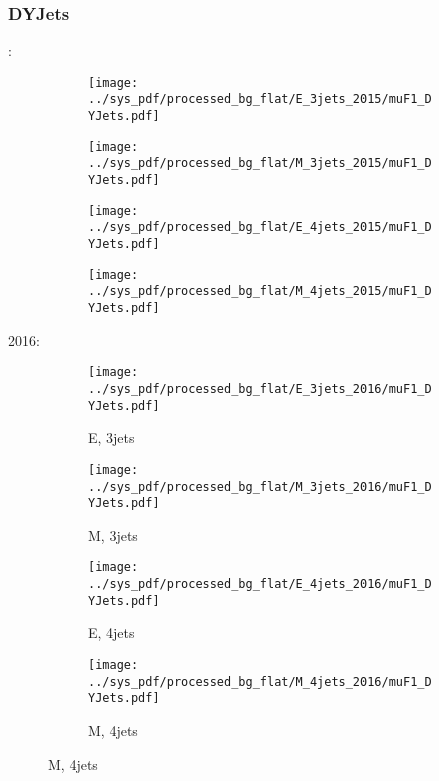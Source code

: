 \documentclass{beamer}
\begin{document}
\begin{frame}
\frametitle{DYJets}
\fontsize{5}{1}:
\begin{figure}
\centering
\begin{subfigure}[b]{0.24\textwidth}
\texttt{[image: ../sys\_pdf/processed\_bg\_flat/E\_3jets\_2015/muF1\_DYJets.pdf]}
\end{subfigure}
\begin{subfigure}[b]{0.24\textwidth}
\texttt{[image: ../sys\_pdf/processed\_bg\_flat/M\_3jets\_2015/muF1\_DYJets.pdf]}
\end{subfigure}
\begin{subfigure}[b]{0.24\textwidth}
\texttt{[image: ../sys\_pdf/processed\_bg\_flat/E\_4jets\_2015/muF1\_DYJets.pdf]}
\end{subfigure}
\begin{subfigure}[b]{0.24\textwidth}
\texttt{[image: ../sys\_pdf/processed\_bg\_flat/M\_4jets\_2015/muF1\_DYJets.pdf]}
\end{subfigure}
\end{figure}
2016:
\begin{figure}
\centering
\begin{subfigure}[b]{0.24\textwidth}
\texttt{[image: ../sys\_pdf/processed\_bg\_flat/E\_3jets\_2016/muF1\_DYJets.pdf]}
\captionsetup{font=tiny}
\caption{E, 3jets}
\end{subfigure}
\begin{subfigure}[b]{0.24\textwidth}
\texttt{[image: ../sys\_pdf/processed\_bg\_flat/M\_3jets\_2016/muF1\_DYJets.pdf]}
\captionsetup{font=tiny}
\caption{M, 3jets}
\end{subfigure}
\begin{subfigure}[b]{0.24\textwidth}
\texttt{[image: ../sys\_pdf/processed\_bg\_flat/E\_4jets\_2016/muF1\_DYJets.pdf]}
\captionsetup{font=tiny}
\caption{E, 4jets}
\end{subfigure}
\begin{subfigure}[b]{0.24\textwidth}
\texttt{[image: ../sys\_pdf/processed\_bg\_flat/M\_4jets\_2016/muF1\_DYJets.pdf]}
\captionsetup{font=tiny}
\caption{M, 4jets}
\end{subfigure}
\end{figure}
\end{frame}
\end{document}
